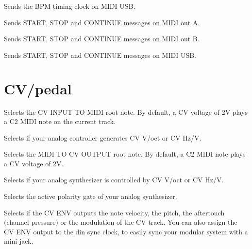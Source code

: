   

Sends the BPM timing clock on MIDI USB.

  

Sends START, STOP and CONTINUE messages on MIDI out A.

  

Sends START, STOP and CONTINUE messages on MIDI out B.

  

Sends START, STOP and CONTINUE messages on MIDI USB.


\section{CV/pedal}

  \settingopt{\ldots} 

Selects the CV INPUT TO MIDI root note. By default, a CV voltage of 2V plays a C2 MIDI note on the current track.

  

Selects if your analog controller generates CV V/oct or CV Hz/V.

  \settingopt{\ldots} 

Selects the MIDI TO CV OUTPUT root note. By default, a C2 MIDI note plays a CV voltage of 2V.

  

Selects if your analog synthesizer is controlled by CV V/oct or CV Hz/V.

  

Selects the active polarity gate of your analog synthesizer.

     

Selects if the CV ENV outputs the note velocity, the pitch, the aftertouch (channel pressure) or the modulation of the CV track. You can also assign the CV ENV output to the din sync clock, to easily sync your modular system with a mini jack.

